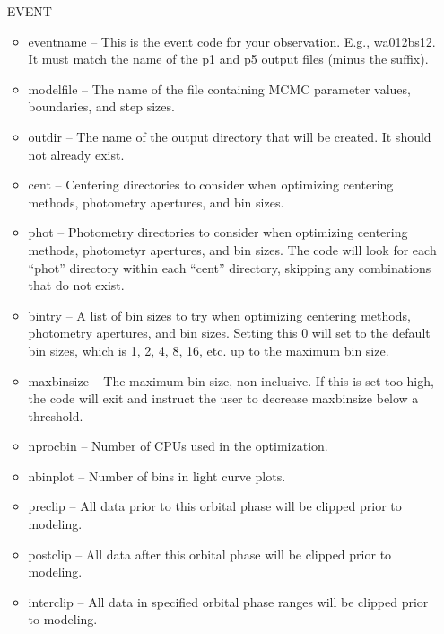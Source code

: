 \documentclass[letterpaper,12pt]{article}
\begin{document}
\begin{itemize}
\item [EVENT]
  \begin{itemize}
\item eventname -- This is the event code for your observation. E.g.,
  wa012bs12. It must match the name of the p1 and p5 output files
  (minus the suffix).

\item modelfile -- The name of the file containing MCMC parameter values,
  boundaries, and step sizes.

\item outdir -- The name of the output directory that will be
  created. It should not already exist.

\item cent -- Centering directories to consider when optimizing
  centering methods, photometry apertures, and bin sizes.

\item phot -- Photometry directories to consider when optimizing
  centering methods, photometyr apertures, and bin sizes. The code
  will look for each ``phot'' directory within each ``cent''
  directory, skipping any combinations that do not exist.

\item bintry -- A list of bin sizes to try when optimizing centering
  methods, photometry apertures, and bin sizes. Setting this 0 will set
  to the default bin sizes, which is 1, 2, 4, 8, 16, etc. up to the
  maximum bin size.

\item maxbinsize -- The maximum bin size, non-inclusive. If this is
  set too high, the code will exit and instruct the user to decrease
  maxbinsize below a threshold.

\item nprocbin -- Number of CPUs used in the optimization.

\item nbinplot -- Number of bins in light curve plots.

\item preclip -- All data prior to this orbital phase will be clipped
  prior to modeling.

\item postclip -- All data after this orbital phase will be clipped
  prior to modeling.

\item interclip -- All data in specified orbital phase ranges will be
  clipped prior to modeling.


\end{itemize}
\end{itemize}
\end{document}
